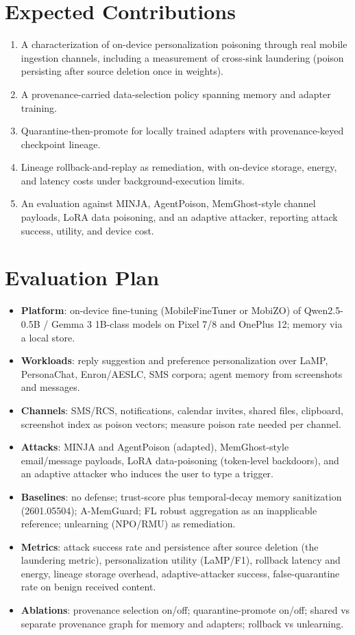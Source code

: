 \documentclass[11pt]{article}
\begin{document}
\section{Expected Contributions}
\begin{enumerate}
  \item A characterization of on-device personalization poisoning through real mobile ingestion channels, including a measurement of cross-sink laundering (poison persisting after source deletion once in weights).
  \item A provenance-carried data-selection policy spanning memory and adapter training.
  \item Quarantine-then-promote for locally trained adapters with provenance-keyed checkpoint lineage.
  \item Lineage rollback-and-replay as remediation, with on-device storage, energy, and latency costs under background-execution limits.
  \item An evaluation against MINJA, AgentPoison, MemGhost-style channel payloads, LoRA data poisoning, and an adaptive attacker, reporting attack success, utility, and device cost.
\end{enumerate}

\section{Evaluation Plan}
\begin{itemize}
  \item \textbf{Platform}: on-device fine-tuning (MobileFineTuner or MobiZO) of Qwen2.5-0.5B / Gemma 3 1B-class models on Pixel 7/8 and OnePlus 12; memory via a local store.
  \item \textbf{Workloads}: reply suggestion and preference personalization over LaMP, PersonaChat, Enron/AESLC, SMS corpora; agent memory from screenshots and messages.
  \item \textbf{Channels}: SMS/RCS, notifications, calendar invites, shared files, clipboard, screenshot index as poison vectors; measure poison rate needed per channel.
  \item \textbf{Attacks}: MINJA and AgentPoison (adapted), MemGhost-style email/message payloads, LoRA data-poisoning (token-level backdoors), and an adaptive attacker who induces the user to type a trigger.
  \item \textbf{Baselines}: no defense; trust-score plus temporal-decay memory sanitization (2601.05504); A-MemGuard; FL robust aggregation as an inapplicable reference; unlearning (NPO/RMU) as remediation.
  \item \textbf{Metrics}: attack success rate and persistence after source deletion (the laundering metric), personalization utility (LaMP/F1), rollback latency and energy, lineage storage overhead, adaptive-attacker success, false-quarantine rate on benign received content.
  \item \textbf{Ablations}: provenance selection on/off; quarantine-promote on/off; shared vs separate provenance graph for memory and adapters; rollback vs unlearning.
\end{itemize}
\end{document}
